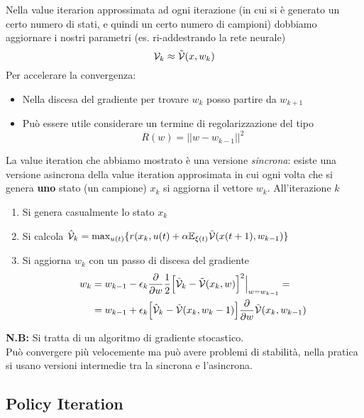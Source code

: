 Nella value iterarion approssimata ad ogni iterazione (in cui si \`e generato un certo numero di stati, e quindi un certo numero di campioni) dobbiamo aggiornare i nostri parametri (es. ri-addestrando la rete neurale)
\begin{equation}
\mathcal{V}_k \approx \tilde{\mathcal{V}}(x, w_k)
\end{equation} Per accelerare la convergenza:
\begin{itemize}
\item Nella discesa del gradiente per trovare $w_k$ posso partire da $w_{k+1}$
\item Pu\`o essere utile considerare un termine di regolarizzazione del tipo
    \begin{equation}
    R(w) = ||w - w_{k-1}||^2
    \end{equation}
\end{itemize}

La value iteration che abbiamo mostrato \`e una versione \textit{sincrona}: esiste una versione asincrona della value iteration approsimata in cui ogni volta che si genera \textbf{uno} stato (un campione) $x_k$ si aggiorna il vettore $w_k$. All'iterazione $k$
\begin{enumerate}
\item Si genera casualmente lo stato $x_k$
\item Si calcola $\hat{\mathcal{V}}_k = \max_{u(t)} \{ r(x_k, u(t) + \alpha \mathbb{E}_{\xi(t)} \tilde{\mathcal{V}}(x(t+1), w_{k-1}) \}$
\item Si aggiorna $w_k$ con un passo di discesa del gradiente
    \begin{align}
    w_k &= w_{k-1} - \epsilon_k \frac{\partial}{\partial w} \frac{1}{2} \Big [ \hat{\mathcal{V}}_k - \tilde{\mathcal{V}}(x_k,w) \Big]^2 \Big |_{w=w_{k-1}} = \\
    &= w_{k-1} + \epsilon_k \Big [ \hat{\mathcal{V}}_k - \tilde{\mathcal{V}}(x_k,w_k-1) \Big] \frac{\partial}{\partial w} \tilde{\mathcal{V}}(x_k, w_{k-1})
    \end{align}
\end{enumerate}
\textbf{N.B:} Si tratta di un algoritmo di gradiente stocastico.\\
Pu\`o convergere pi\`u velocemente ma pu\`o avere problemi di stabilit\`a, nella pratica si usano versioni intermedie tra la sincrona e l'asincrona.

\subsection{Policy Iteration}

